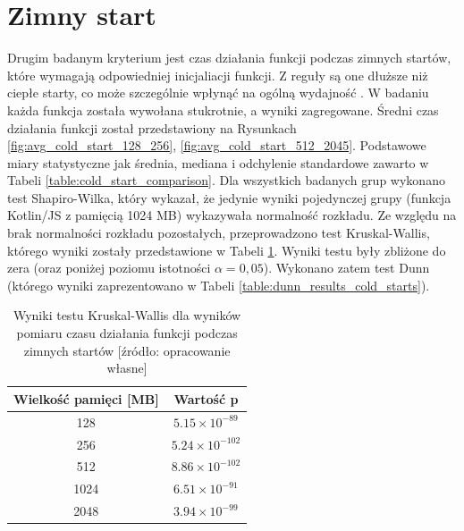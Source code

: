 \newpage
\section{Zimny start}\label{chapter:results_cold_start}

Drugim badanym kryterium jest czas działania funkcji podczas zimnych startów, które wymagają odpowiedniej inicjaliacji funkcji.
Z reguły są one dłuższe niż ciepłe starty, co może szczególnie wpłynąć na ogólną wydajność \cite{9284261}\cite{8605777}.
W badaniu każda funkcja została wywołana stukrotnie, a wyniki zagregowane.
Średni czas działania funkcji został przedstawiony na Rysunkach \ref{fig:avg_cold_start_128_256}, \ref{fig:avg_cold_start_512_2045}.
Podstawowe miary statystyczne jak średnia, mediana i odchylenie standardowe zawarto w Tabeli \ref{table:cold_start_comparison}.
Dla wszystkich badanych grup wykonano test Shapiro-Wilka, który wykazał, że jedynie wyniki pojedynczej grupy 
(funkcja Kotlin/JS z pamięcią 1024 MB) wykazywała normalność rozkładu.
Ze względu na brak normalności rozkładu pozostałych, przeprowadzono test Kruskal-Wallis, którego wyniki zostały przedstawione w Tabeli \ref{table:kruskal_wallis_test_cold_starts}. 
Wyniki testu były zbliżone do zera (oraz poniżej poziomu istotności $\alpha = 0,05$).
Wykonano zatem test Dunn (którego wyniki zaprezentowano w Tabeli \ref{table:dunn_results_cold_starts}).

\begin{table}[H]
    \centering
    \caption{Wyniki testu Kruskal-Wallis dla wyników pomiaru czasu działania funkcji podczas zimnych startów [źródło: opracowanie własne]}
    \begin{tabular}{|c|c|}
    \hline
    \textbf{Wielkość pamięci [MB]} & \textbf{Wartość p} \\
    \hline
    128 & $5.15 \times 10^{-89}$ \\
    \hline
    256 & $5.24 \times 10^{-102}$ \\
    \hline
    512 & $8.86 \times 10^{-102}$ \\
    \hline
    1024 & $6.51 \times 10^{-91}$ \\
    \hline
    2048 & $3.94 \times 10^{-99}$ \\
    \hline
    \end{tabular}
    \label{table:kruskal_wallis_test_cold_starts}
\end{table}

